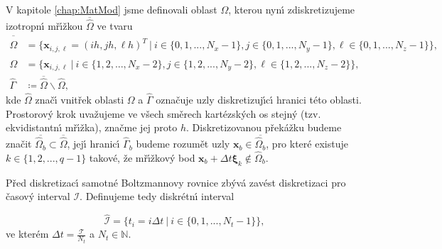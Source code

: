         V kapitole \ref{chap:MatMod} jsme definovali oblast $\Omega$, kterou nyn\'{\i} zdiskretizujeme izotropn\'{\i} m\v{r}\'{\i}\v{z}kou $\overline{\hat{\Omega}}$ ve tvaru
        \begin{subequations}
        \begin{align}
            \overline{\hat{\Omega}} &= \{ \boldsymbol{x}_{i,j,\ell} = \left(i h, j h, \ell h\right)^T \ | \ i \in \{0,1,...,N_{x}-1 \}, j \in \{0,1,...,N_{y}-1 \}, \ell \in \{0,1,...,N_{z}-1 \} \}, \label{eq:CloLatNod} \\
            \hat{\Omega} &= \{ \boldsymbol{x}_{i,j,\ell} \ | \ i \in \{1,2,...,N_{x}-2 \}, j \in \{1,2,...,N_{y}-2 \}, \ell \in \{1,2,...,N_{z}-2 \} \}, \label{eq:InnLatNod} \\
            \hat{\Gamma} &\coloneqq \overline{\hat{\Omega}} \backslash \hat{\Omega}, \label{eq:BorLatNod}
        \end{align}
        \end{subequations}
        kde $\hat{\Omega}$ zna\v{c}\'{\i} vnit\v{r}ek oblasti $\Omega$ a $\hat{\Gamma}$ ozna\v{c}uje uzly diskretizuj\'{\i}c\'{\i} hranici t\'{e}to oblasti. Prostorov\'{y} krok uva\v{z}ujeme ve v\v{s}ech sm\v{e}rech kart\'{e}zsk\'{y}ch os stejn\'{y} (tzv. ekvidistantn\'{\i} m\v{r}\'{\i}\v{z}ka), zna\v{c}me jej proto $h$. Diskretizovanou p\v{r}ek\'{a}\v{z}ku budeme zna\v{c}it $\overline{\hat{\Omega}_b} \subset \overline{\hat{\Omega}}$, jej\'{\i} hranic\'{\i} $\hat{\Gamma}_b$ budeme rozum\v{e}t uzly $\boldsymbol{x}_b \in \overline{\hat{\Omega}_b}$, pro kter\'{e} existuje $k \in \{ 1,2,...,q-1 \}$ takov\'{e}, \v{z}e m\v{r}\'{\i}\v{z}kov\'{y} bod $\boldsymbol{x}_b + \Delta t \boldsymbol{\xi}_k \notin \hat{\Omega}_b$.

        P\v{r}ed diskretizac\'{\i} samotn\'{e} Boltzmannovy rovnice zb\'{y}v\'{a} zav\'{e}st diskretizaci pro \v{c}asov\'{y} interval $\mathcal{I}$. Definujeme tedy diskr\'{e}tn\'{\i} interval 

        \begin{equation}
        \label{eq:DisTimInt}
                \hat{\mathcal{I}} = \{ t_i = i\Delta t \ | \ i \in \{ 0,1,...,N_{t}-1 \} \},
        \end{equation}
        ve kter\'{e}m $\Delta t = \frac{\mathcal{T}}{N_{t}}$ a $N_{t} \in \mathbb{N}$.
        
            
